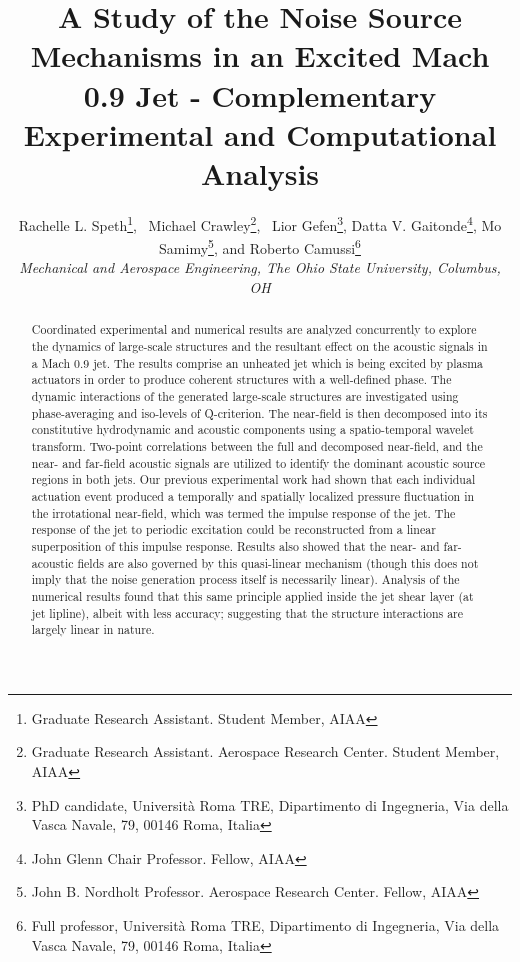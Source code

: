\documentclass[english]{aiaa-tc}
\begin{document}
\title{A Study of the Noise Source Mechanisms in an Excited Mach 0.9 Jet - Complementary Experimental and Computational Analysis}


\author{Rachelle L. Speth\thanks{Graduate Research Assistant. Student Member, AIAA}, \
Michael Crawley\thanks{Graduate Research Assistant. Aerospace Research Center. Student Member, AIAA}, \
Lior Gefen\thanks{PhD candidate, Università Roma TRE, Dipartimento di Ingegneria, Via della Vasca Navale, 79, 00146 Roma, Italia}, Datta V. Gaitonde\thanks{John Glenn Chair Professor. Fellow, AIAA}, Mo Samimy\thanks{John B. Nordholt Professor. Aerospace Research Center. Fellow, AIAA}, and Roberto Camussi\thanks{Full professor, Università Roma TRE, Dipartimento di Ingegneria, Via della Vasca Navale, 79, 00146 Roma, Italia}
\\\normalsize\itshape Mechanical and Aerospac\textbf{}e Engineering, The Ohio State University, Columbus, OH \\}


\maketitle

\begin{abstract}
Coordinated experimental and numerical results are analyzed concurrently to explore the dynamics of large-scale structures and the resultant effect on the acoustic signals in a Mach 0.9 jet.
The results comprise an unheated jet which is being excited by plasma actuators in order to produce coherent structures with a well-defined phase.
The dynamic interactions of the generated large-scale structures are investigated using phase-averaging and iso-levels of Q-criterion.
The near-field is then decomposed into its constitutive hydrodynamic and acoustic components using a spatio-temporal wavelet transform.
Two-point correlations between the full and decomposed near-field, and the near- and far-field acoustic signals are utilized to identify the dominant acoustic source regions in both jets.
Our previous experimental work had shown that each individual actuation event produced a temporally and spatially localized pressure fluctuation in the irrotational near-field, which was termed the impulse response of the jet. The response of the jet to periodic excitation could be reconstructed from a linear superposition of this impulse response.
Results also showed that the near- and far-acoustic fields are also governed by this quasi-linear mechanism (though this does not imply that the noise generation process itself is necessarily linear).
Analysis of the numerical results found that this same principle applied inside the jet shear layer (at jet lipline), albeit with less accuracy; suggesting that the structure interactions are largely linear in nature.


\end{abstract}
\end{document}
